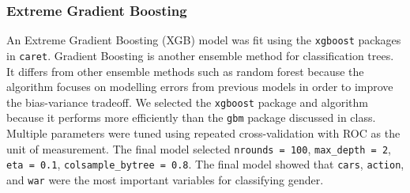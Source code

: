 \documentclass[]{article}
\begin{document}
\subsubsection{Extreme Gradient
Boosting}\label{extreme-gradient-boosting}

An Extreme Gradient Boosting (XGB) model was fit using the
\texttt{xgboost} packages in \texttt{caret}. Gradient Boosting is
another ensemble method for classification trees. It differs from other
ensemble methods such as random forest because the algorithm focuses on
modelling errors from previous models in order to improve the
bias-variance tradeoff. We selected the \texttt{xgboost} package and
algorithm because it performs more efficiently than the \texttt{gbm}
package discussed in class. Multiple parameters were tuned using
repeated cross-validation with ROC as the unit of measurement. The final
model selected \texttt{nrounds\ =\ 100}, \texttt{max\_depth\ =\ 2},
\texttt{eta\ =\ 0.1}, \texttt{colsample\_bytree\ =\ 0.8}. The final
model showed that \texttt{cars}, \texttt{action}, and \texttt{war} were
the most important variables for classifying gender.
\end{document}
